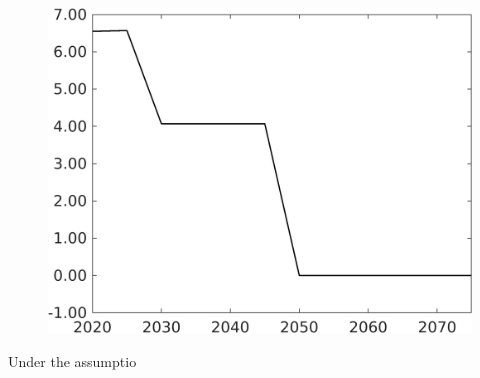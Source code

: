 \begin{figure}[h!!]
\begin{minipage}[]{0.32\textwidth}
\end{minipage}
\begin{minipage}[]{0.32\textwidth}
	\includegraphics[width=1\textwidth]{../../codding_model/own_basedOnFried/optimalPol_elastS_DisuSci/figures/all_1705/Single_OPT_T_NoTaus_Emnet_spillover0_sep1_BN0_ineq0_etaa0.79.png}
\end{minipage}
\end{figure} 
Under the assumptio